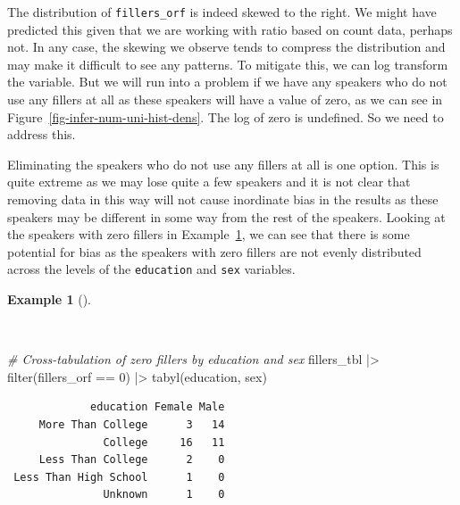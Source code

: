 \documentclass[
  letterpaper,
  krantz1]{latex/krantz-mod}
\newenvironment{Shaded}{\begin{snugshade}}{\end{snugshade}}
\newcommand{\CommentTok}[1]{\textcolor[rgb]{0.00,0.00,0.00}{\textit{#1}}}
\newcommand{\DecValTok}[1]{\textcolor[rgb]{0.00,0.00,0.00}{#1}}
\newcommand{\FunctionTok}[1]{\textcolor[rgb]{0.00,0.00,0.00}{#1}}
\newcommand{\NormalTok}[1]{\textcolor[rgb]{0.00,0.00,0.00}{#1}}
\newcommand{\SpecialCharTok}[1]{\textcolor[rgb]{0.00,0.00,0.00}{#1}}
\theoremstyle{definition}
\theoremstyle{definition}
\newtheorem{example}{Example}[chapter]
\theoremstyle{remark}
\begin{document}
The distribution of \texttt{fillers\_orf} is indeed skewed to the right.
We might have predicted this given that we are working with ratio based
on count data, perhaps not. In any case, the skewing we observe tends to
compress the distribution and may make it difficult to see any patterns.
To mitigate this, we can log transform the
variable. But we will run into a problem if we have any speakers who do
not use any fillers at all as these speakers will have a value of zero,
as we can see in Figure~\ref{fig-infer-num-uni-hist-dens}. The log of
zero is undefined. So we need to address this.

Eliminating the speakers who do not use any fillers at all is one
option. This is quite extreme as we may lose quite a few speakers and it
is not clear that removing data in this way will not cause inordinate
bias in the results as these speakers may be different in some way from
the rest of the speakers. Looking at the speakers with zero fillers in
Example~\ref{exm-infer-num-uni-zero-fillers}, we can see that there is
some potential for bias as the speakers with zero fillers are not evenly
distributed across the levels of the \texttt{education} and \texttt{sex}
variables.

\begin{example}[]\protect\hypertarget{exm-infer-num-uni-zero-fillers}{}\label{exm-infer-num-uni-zero-fillers}

~

\begin{Shaded}
\begin{Highlighting}[numbers=left,,]
\CommentTok{\# Cross{-}tabulation of zero fillers by education and sex}
\NormalTok{fillers\_tbl }\SpecialCharTok{|\textgreater{}}
  \FunctionTok{filter}\NormalTok{(fillers\_orf }\SpecialCharTok{==} \DecValTok{0}\NormalTok{) }\SpecialCharTok{|\textgreater{}}
  \FunctionTok{tabyl}\NormalTok{(education, sex)}
\end{Highlighting}
\end{Shaded}

\begin{verbatim}
             education Female Male
     More Than College      3   14
               College     16   11
     Less Than College      2    0
 Less Than High School      1    0
               Unknown      1    0
\end{verbatim}


\end{example}
\end{document}
